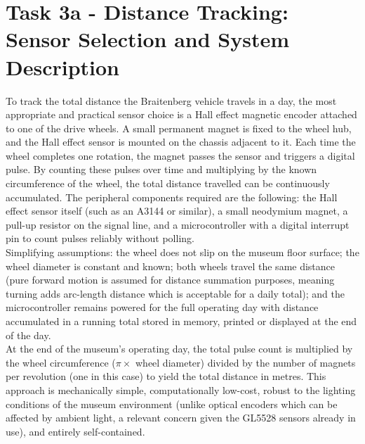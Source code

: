 \documentclass[11 pt , a 4 paper ]{article}
\theoremstyle{definition}
\begin{document}
  \section*{Task 3a - Distance Tracking: Sensor Selection and System Description}
  To track the total distance the Braitenberg vehicle travels in a day, the most appropriate and practical sensor choice is a Hall effect magnetic encoder attached to one of the drive wheels. A small permanent magnet is fixed to the wheel hub, and the Hall effect sensor is mounted on the chassis adjacent to it. Each time the wheel completes one rotation, the magnet passes the sensor and triggers a digital pulse. By counting these pulses over time and multiplying by the known circumference of the wheel, the total distance travelled can be continuously accumulated. The peripheral components required are the following: the Hall effect sensor itself (such as an A3144 or similar), a small neodymium magnet, a pull-up resistor on the signal line, and a microcontroller with a digital interrupt pin to count pulses reliably without polling.\\

  \noindent Simplifying assumptions: the wheel does not slip on the museum floor surface; the wheel diameter is constant and known; both wheels travel the same distance (pure forward motion is assumed for distance summation purposes, meaning turning adds arc-length distance which is acceptable for a daily total); and the microcontroller remains powered for the full operating day with distance accumulated in a running total stored in memory, printed or displayed at the end of the day.\\

\noindent At the end of the museum's operating day, the total pulse count is multiplied by the wheel circumference ($\pi \times$  wheel diameter) divided by the number of magnets per revolution (one in this case) to yield the total distance in metres. This approach is mechanically simple, computationally low-cost, robust to the lighting conditions of the museum environment (unlike optical encoders which can be affected by ambient light, a relevant concern given the GL5528 sensors already in use), and entirely self-contained.
\end{document}
